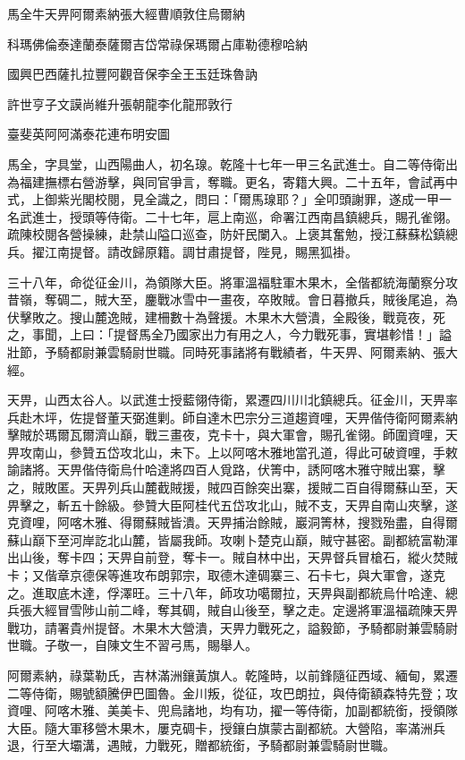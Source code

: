 
\begin{pinyinscope}
馬全牛天畀阿爾素納張大經曹順敦住烏爾納

科瑪佛倫泰達蘭泰薩爾吉岱常祿保瑪爾占庫勒德穆哈納

國興巴西薩扎拉豐阿觀音保李全王玉廷珠魯訥

許世亨子文謨尚維升張朝龍李化龍邢敦行

臺斐英阿阿滿泰花連布明安圖

馬全，字具堂，山西陽曲人，初名瑔。乾隆十七年一甲三名武進士。自二等侍衛出為福建撫標右營游擊，與同官爭言，奪職。更名，寄籍大興。二十五年，會試再中式，上御紫光閣校閱，見全識之，問曰：「爾馬瑔耶？」全叩頭謝罪，遂成一甲一名武進士，授頭等侍衛。二十七年，扈上南巡，命署江西南昌鎮總兵，賜孔雀翎。疏陳校閱各營操練，赴禁山隘口巡查，防奸民闌入。上褒其奮勉，授江蘇蘇松鎮總兵。擢江南提督。請改歸原籍。調甘肅提督，陛見，賜黑狐褂。

三十八年，命從征金川，為領隊大臣。將軍溫福駐軍木果木，全偕都統海蘭察分攻昔嶺，奪碉二，賊大至，鏖戰冰雪中一畫夜，卒敗賊。會日暮撤兵，賊後尾追，為伏擊敗之。搜山麓逸賊，建柵數十為聲援。木果木大營潰，全殿後，戰竟夜，死之，事聞，上曰：「提督馬全乃國家出力有用之人，今力戰死事，實堪軫惜！」謚壯節，予騎都尉兼雲騎尉世職。同時死事諸將有戰績者，牛天畀、阿爾素納、張大經。

天畀，山西太谷人。以武進士授藍翎侍衛，累遷四川川北鎮總兵。征金川，天畀率兵赴木坪，佐提督董天弼進剿。師自達木巴宗分三道趨資哩，天畀偕侍衛阿爾素納擊賊於瑪爾瓦爾濟山巔，戰三畫夜，克卡十，與大軍會，賜孔雀翎。師圍資哩，天畀攻南山，參贊五岱攻北山，未下。上以阿喀木雅地當孔道，得此可破資哩，手敕諭諸將。天畀偕侍衛烏什哈達將四百人覓路，伏箐中，誘阿喀木雅守賊出寨，擊之，賊敗匿。天畀列兵山麓截賊援，賊四百餘突出寨，援賊二百自得爾蘇山至，天畀擊之，斬五十餘級。參贊大臣阿桂代五岱攻北山，賊不支，天畀自南山夾擊，遂克資哩，阿喀木雅、得爾蘇賊皆潰。天畀捕治餘賊，巖洞箐林，搜戮殆盡，自得爾蘇山巔下至河岸訖北山麓，皆屬我師。攻喇卜楚克山巔，賊守甚密。副都統富勒渾出山後，奪卡四；天畀自前登，奪卡一。賊自林中出，天畀督兵冒槍石，縱火焚賊卡；又偕章京德保等進攻布朗郭宗，取德木達碉寨三、石卡七，與大軍會，遂克之。進取底木達，俘澤旺。三十八年，師攻功噶爾拉，天畀與副都統烏什哈達、總兵張大經冒雪陟山前二峰，奪其碉，賊自山後至，擊之走。定邊將軍溫福疏陳天畀戰功，請署貴州提督。木果木大營潰，天畀力戰死之，謚毅節，予騎都尉兼雲騎尉世職。子敬一，自陳文生不習弓馬，賜舉人。

阿爾素納，祿葉勒氏，吉林滿洲鑲黃旗人。乾隆時，以前鋒隨征西域、緬甸，累遷二等侍衛，賜號額騰伊巴圖魯。金川叛，從征，攻巴朗拉，與侍衛額森特先登；攻資哩、阿喀木雅、美美卡、兜烏諸地，均有功，擢一等侍衛，加副都統銜，授領隊大臣。隨大軍移營木果木，屢克碉卡，授鑲白旗蒙古副都統。大營陷，率滿洲兵退，行至大壩溝，遇賊，力戰死，贈都統銜，予騎都尉兼雲騎尉世職。


\end{pinyinscope}
